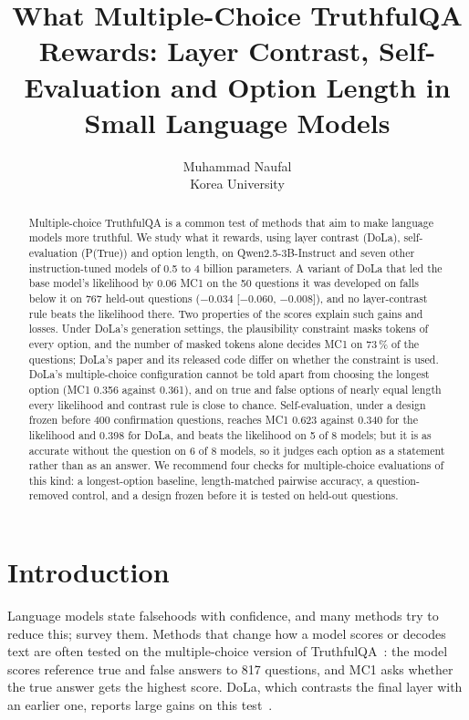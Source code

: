 \documentclass[11pt]{article}
\title{What Multiple-Choice TruthfulQA Rewards: Layer Contrast, Self-Evaluation and Option Length in Small
Language Models}
\author{Muhammad Naufal\\\small Korea University}
\date{}
\newcommand{\mainmodel}{Qwen2.5-3B-Instruct}
\begin{document}
\maketitle

\begin{abstract}
Multiple-choice TruthfulQA is a common test of methods that aim to make language models more truthful. We
study what it rewards, using layer contrast (DoLa), self-evaluation (P(True)) and option length, on
\mainmodel{} and seven other instruction-tuned models of 0.5 to 4 billion parameters. A variant of DoLa that led
the base model's likelihood by 0.06 MC1 on the 50 questions it was developed on falls below it on 767 held-out
questions ($-0.034$ [$-0.060$, $-0.008$]), and no layer-contrast rule beats the likelihood there. Two properties
of the scores explain such gains and losses. Under DoLa's generation settings, the plausibility constraint masks
tokens of every option, and the number of masked tokens alone decides MC1 on 73\,\% of the questions; DoLa's paper
and its released code differ on whether the constraint is used. DoLa's multiple-choice configuration cannot be told
apart from choosing the longest option (MC1 0.356 against 0.361), and on true and false options of nearly equal
length every likelihood and contrast rule is close to chance. Self-evaluation, under a design frozen before 400
confirmation questions, reaches MC1 0.623 against 0.340 for the likelihood and 0.398 for DoLa, and beats the
likelihood on 5 of 8 models; but it is as accurate without the question on 6 of 8 models, so it judges each option
as a statement rather than as an answer. We recommend four checks for multiple-choice evaluations of this kind: a
longest-option baseline, length-matched pairwise accuracy, a question-removed control, and a design frozen before
it is tested on held-out questions.
\end{abstract}

\section{Introduction}
\label{sec:intro}
Language models state falsehoods with confidence, and many methods try to reduce this; \citet{huang2025survey}
survey them. Methods that change how a model scores or decodes text are often tested on the multiple-choice version
of TruthfulQA~\citep{lin2022truthfulqa}: the model scores reference true and false answers to 817 questions, and MC1
asks whether the true answer gets the highest score. DoLa, which contrasts the final layer with an earlier one,
reports large gains on this test~\citep{chuang2024dola}.
\end{document}
